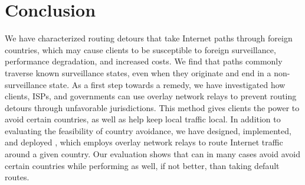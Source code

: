 \section{Conclusion}
\label{conclusion}

We have characterized routing
detours that take Internet paths through foreign countries, which may 
cause clients to be susceptible to foreign surveillance, performance 
degradation, and increased costs.  We find that paths commonly traverse known
surveillance states, even when they originate and end in a
non-surveillance state.  As a first step towards a remedy, we have
investigated how clients, ISPs, and governments can use overlay network relays to prevent routing detours through
unfavorable jurisdictions.  This method gives clients the power to
avoid certain countries, as well as help keep local traffic local.
In addition to evaluating the feasibility of country avoidance, we have
designed, implemented, and deployed \system{}, which employs overlay network
relays to  route Internet traffic around a given country.  Our evaluation
shows  that \system{} can in many cases avoid avoid certain countries while
performing as well, if not better, than taking default routes.


